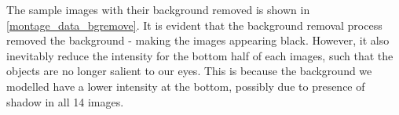 \documentclass[main.tex]{subfiles}
\begin{document}
%
%


The sample images with their background removed is shown in \autoref{montage_data_bgremove}. It is evident that the background removal process removed the background - making the images appearing black. However, it also inevitably reduce the intensity for the bottom half of each images, such that the objects are no longer salient to our eyes. This is because the background we modelled have a lower intensity at the bottom, possibly due to presence of shadow in all 14 images.
\end{document}
